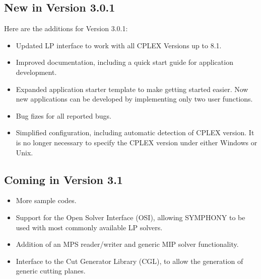 
\subsection{New in Version 3.0.1}

Here are the additions for Version 3.0.1:

\begin{itemize}

\item Updated LP interface to work with all CPLEX Versions up to 8.1.

\item Improved documentation, including a quick start guide for application 
development.

\item Expanded application starter template to make getting started easier. Now
new applications can be developed by implementing only two user functions.

\item Bug fizes for all reported bugs.

\item Simplified configuration, including automatic detection of CPLEX
version. It is no longer necessary to specify the CPLEX version under either
Windows or Unix.

\end{itemize}

\subsection{Coming in Version 3.1}

\begin{itemize}

\item More sample codes.

\item Support for the Open Solver Interface (OSI), allowing SYMPHONY to be
used with most commonly available LP solvers.

\item Addition of an MPS reader/writer and generic MIP solver functionality.

\item Interface to the Cut Generator Library (CGL), to allow the generation of
generic cutting planes.

\end{itemize}

